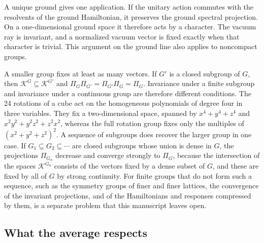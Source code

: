 \documentclass[11pt]{article}
\theoremstyle{definition}
\begin{document}
A unique ground gives one application. If the unitary action commutes with the resolvents of the ground Hamiltonian, it preserves the ground spectral projection. On a one-dimensional ground space it therefore acts by a character. The vacuum ray is invariant, and a normalized vacuum vector is fixed exactly when that character is trivial. This argument on the ground line also applies to noncompact groups.

A smaller group fixes at least as many vectors. If $G'$ is a closed subgroup of $G$, then $\mathcal K^G\subseteq\mathcal K^{G'}$ and $\Pi_G\Pi_{G'}=\Pi_{G'}\Pi_G=\Pi_G$. Invariance under a finite subgroup and invariance under a continuous group are therefore different conditions. The 24 rotations of a cube act on the homogeneous polynomials of degree four in three variables. They fix a two-dimensional space, spanned by $x^4+y^4+z^4$ and $x^2y^2+y^2z^2+z^2x^2$, whereas the full rotation group fixes only the multiples of $(x^2+y^2+z^2)^2$. A sequence of subgroups does recover the larger group in one case. If $G_1\subseteq G_2\subseteq\cdots$ are closed subgroups whose union is dense in $G$, the projections $\Pi_{G_n}$ decrease and converge strongly to $\Pi_G$, because the intersection of the spaces $\mathcal K^{G_n}$ consists of the vectors fixed by a dense subset of $G$, and these are fixed by all of $G$ by strong continuity. For finite groups that do not form such a sequence, such as the symmetry groups of finer and finer lattices, the convergence of the invariant projections, and of the Hamiltonians and responses compressed by them, is a separate problem that this manuscript leaves open.

\subsection{What the average respects}
\label{subsec:symmetry-compatibility}
\end{document}
